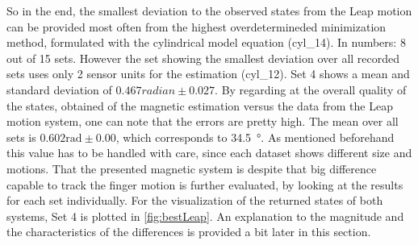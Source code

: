 So in the end, the smallest deviation to the observed states from the Leap motion can be provided most often from the highest overdetermineded minimization method, formulated with the cylindrical model equation (cyl\_14). In numbers: 8 out of 15 sets. 
However the set showing the smallest deviation over all recorded sets uses only 2 sensor units for the estimation (cyl\_12). Set 4 shows a mean and standard deviation of $ 0.467 \si{radian} \pm 0.027 $. By regarding at the overall quality of the states, obtained of the magnetic estimation versus the data from the Leap motion system, one can note that the errors are pretty high. The mean over all sets is $ 0.602 \si{\radian} \pm 0.00 $, which corresponds to \SI{34.5}{\degree}. As mentioned beforehand this value has to be handled with care, since each dataset shows different size and motions. That the presented magnetic system is despite that big difference capable to track the finger motion is further evaluated, by looking at the results for each set individually. For the visualization of the returned states of both systems, Set 4 is plotted in \ref{fig:bestLeap}. An explanation to the magnitude and the characteristics of the differences is provided a bit later in this section. 

